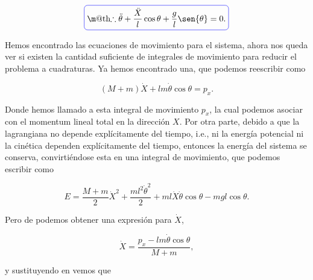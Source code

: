 \documentclass[a4paper,10pt]{article}
\makeatletter
\numberwithin{equation}{section}
\newcommand*{\boxcolor}{blue}
\renewcommand{\boxed}[1]{\textcolor{\boxcolor}{%
\tikz[baseline={([yshift=-1ex]current bounding box.center)}] \node [rectangle, minimum width=1ex,rounded corners,draw] {\normalcolor\m@th$\displaystyle#1$};}}
\makeatother
\begin{document}
\begin{equation}
 \boxed{\therefore \ddot{\theta}  + \frac{\ddot{X}}{l}\cos{\theta} + \frac{g}{l}\sen{\theta} = 0.}
\label{eq:pendudiferential1}
 \end{equation}

Hemos encontrado las ecuaciones de movimiento para el sistema, ahora nos queda ver 
si existen la cantidad suficiente de integrales de movimiento para reducir el problema 
a cuadraturas. Ya hemos encontrado una, que podemos reescribir como

\begin{equation}
 (M + m)\dot{X} + lm\dot{\theta} \cos{\theta} = p_x.
 \label{eq:pendu8}
\end{equation}

Donde hemos llamado a esta integral de movimiento $p_x$, la cual podemos asociar con el 
momentum lineal total en la dirección $X$. Por otra parte, debido a que la lagrangiana 
no depende explícitamente del tiempo, i.e., ni la energía potencial ni la cinética dependen 
explícitamente del tiempo, entonces la energía del sistema se conserva, convirtiéndose 
esta en una integral de movimiento, que podemos escribir como

\begin{equation}
  E = \frac{M+m}{2}\dot{X}^2 + \frac{ml^2 \dot{\theta}^2}{2} + 
    ml\dot{X}\dot{\theta}\cos{\theta} - mgl \cos{\theta}.
    \label{eq:pendu9}
\end{equation}

Pero de  podemos obtener una expresión para $\dot{X}$,

\begin{equation}
 \dot{X} = \frac{p_x - lm\dot{\theta}\cos{\theta}}{M+m},
 \label{eq:pendu10}
\end{equation}

y sustituyendo  en  vemos que 
\end{document}
